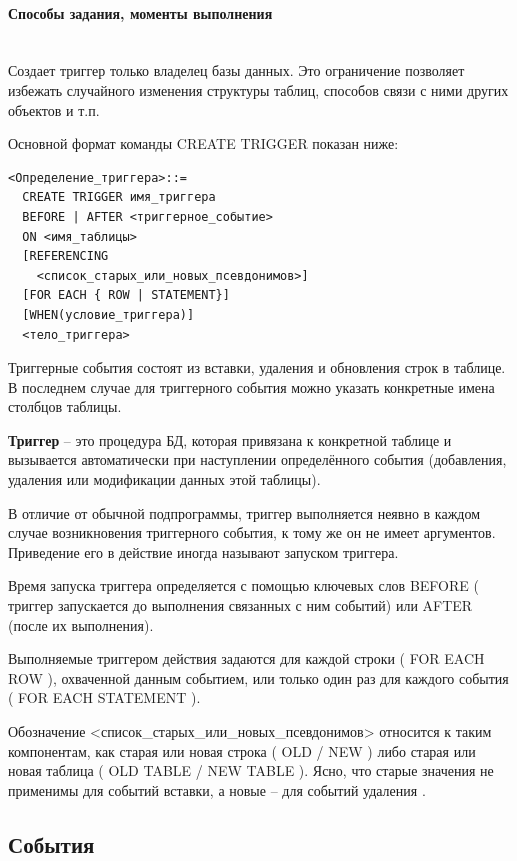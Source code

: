 \paragraph{Способы задания, моменты выполнения} ~\\

Создает триггер только владелец базы данных. Это ограничение позволяет избежать случайного изменения структуры таблиц, способов связи с ними других объектов и т.п.


Основной формат команды CREATE TRIGGER показан ниже:
\begin{verbatim}
<Определение_триггера>::=
  CREATE TRIGGER имя_триггера
  BEFORE | AFTER <триггерное_событие>
  ON <имя_таблицы>
  [REFERENCING
    <список_старых_или_новых_псевдонимов>]
  [FOR EACH { ROW | STATEMENT}]
  [WHEN(условие_триггера)]
  <тело_триггера>
\end{verbatim}

Триггерные события состоят из вставки, удаления и обновления строк в таблице. В последнем случае для триггерного события можно указать конкретные имена столбцов таблицы.

\begin{grayquote}
    \textbf{Триггер} – это процедура БД, которая привязана к конкретной таблице и вызывается автоматически при наступлении определённого события (добавления, удаления или модификации данных этой таблицы).
\end{grayquote}

В отличие от обычной подпрограммы, триггер выполняется неявно в каждом случае возникновения триггерного события, к тому же он не имеет аргументов. Приведение его в действие иногда называют запуском триггера.


Время запуска триггера определяется с помощью ключевых слов BEFORE ( триггер запускается до выполнения связанных с ним событий) или AFTER (после их выполнения).


Выполняемые триггером действия задаются для каждой строки ( FOR EACH ROW ), охваченной данным событием, или только один раз для каждого события ( FOR EACH STATEMENT ).


Обозначение <список\_старых\_или\_новых\_псевдонимов> относится к таким компонентам, как старая или новая строка ( OLD / NEW ) либо старая или новая таблица ( OLD TABLE / NEW TABLE ). Ясно, что старые значения не применимы для событий вставки, а новые – для событий удаления \autocite{IntuitTrigg}.

\subsection{События}


